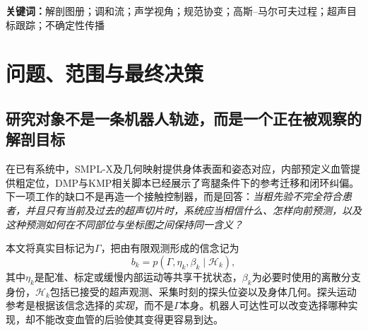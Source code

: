 \documentclass[UTF8,11pt,a4paper,fontset=fandol]{ctexart}
\numberwithin{equation}{section}
\theoremstyle{plain}
\theoremstyle{definition}
\theoremstyle{remark}
\begin{document}
\begin{abstract}
机器人超声扫描需要把人体外部形状、体内粗解剖先验与局部、延迟且可能失真的超声观测联系起来。已有基于解剖坐标的路径迁移能够保持部分跨姿态对应，但三个核心问题仍需明确：独立调和坐标的联合可逆性并无一般三维保证；体内目标到体表的几何投影不等于有效声学视角；预规划曲线或示教散布不等于真实患者未扫描区域的后验不确定性。本稿提出一条不依赖新增神经网络的研究路线。首先，以一个标量调和势定义正则流，通过沿流运输表面标签构造局部体积坐标，并在流覆盖域内推导逆映射、变分Jacobian和条件性单射保证；多个部位通过真实重叠区的过渡映射组成图册，而非将全身强制映射到单一圆柱。其次，保留体内目标本体，独立表示从候选接触点出发的声束方向、成像平面与绕束角度，建立角度的规范变换及几何敏感性。再次，把目标相对参考曲线的偏差定义为法丛上的随机截面，以三阶空间高斯--马尔可夫过程获得二阶连续的未来曲线、完整跨位置协方差和有限远期先验。通过曲线与成像平面的隐式交点构造观测似然，进行固定滞后在线更新；近处收缩、远处展开的预测区域由该模型计算，而不靠人为画锥。最后，将坐标正则性、声学横截性和后验协方差结合为可计算的可信前视域，并仅向既有IRD和执行器输出目标与视角分布。本文给出模型取舍、完整推导、实现边界、合成一致性检查及实验方案，以区分数学正确性、统计校准和真实扫描性能。
\end{abstract}
\noindent\textbf{关键词：}解剖图册；调和流；声学视角；规范协变；高斯--马尔可夫过程；超声目标跟踪；不确定性传播
\setcounter{tocdepth}{1}
\tableofcontents
\clearpage

\section{问题、范围与最终决策}\label{sec:intro}
\subsection{研究对象不是一条机器人轨迹，而是一个正在被观察的解剖目标}
在已有系统中，SMPL-X及几何映射提供身体表面和姿态对应，内部预定义血管提供粗定位，DMP与KMP相关脚本已经展示了弯腿条件下的参考迁移和闭环纠偏。下一项工作的缺口不是再造一个接触控制器，而是回答：\emph{当粗先验不完全符合患者，并且只有当前及过去的超声切片时，系统应当相信什么、怎样向前预测，以及这种预测如何在不同部位与坐标图之间保持同一含义？}

本文将真实目标记为$\Gamma$，把由有限观测形成的信念记为
\begin{equation}
 b_k=p(\Gamma,\eta_k,\beta_k\mid \mathcal H_k),
 \label{eq:belief-object}
\end{equation}
其中$\eta_k$是配准、标定或缓慢内部运动等共享干扰状态，$\beta_k$为必要时使用的离散分支身份，$\mathcal H_k$包括已接受的超声观测、采集时刻的探头位姿以及身体几何。探头运动参考是根据该信念选择的\emph{实现}，而不是$\Gamma$本身。机器人可达性可以改变选择哪种实现，却不能改变血管的后验使其变得更容易到达。
\end{document}
